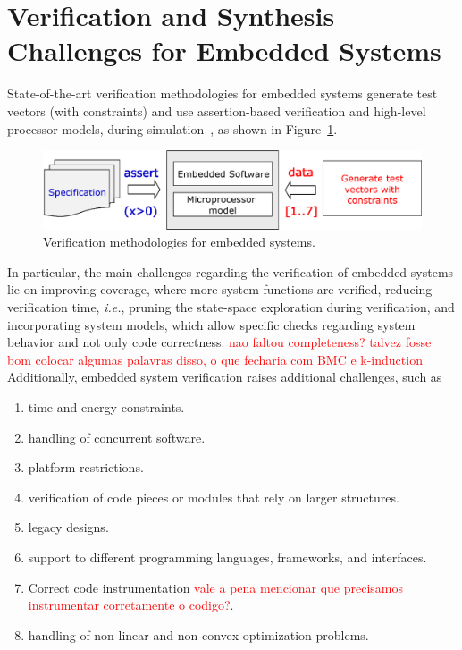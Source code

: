 \documentclass{acm_sen_article}
\begin{document}
\section{Verification and Synthesis \\ Challenges for Embedded Systems}
\label{Verification-Challenges} 

State-of-the-art verification methodologies for embedded systems generate test vectors (with constraints) and use assertion-based verification and high-level processor models, during simulation~\cite{Behrend15,Lettnin09}, as shown in Figure~\ref{verification-methodologies}. 
%
\begin{figure}[h]
	\centering
	\includegraphics[scale=0.35]{figure3.eps}
	\caption{Verification methodologies for embedded systems.}
	\label{verification-methodologies}
\end{figure}


In particular, the main challenges regarding the verification of embedded systems lie on improving coverage, where more system functions are verified, reducing verification time, {\it i.e.}, pruning the state-space exploration during verification, and incorporating system models, which allow specific checks regarding system behavior and not only code correctness. \textcolor{red}{nao faltou completeness? talvez fosse bom colocar algumas palavras disso, o que fecharia com BMC e k-induction} Additionally, embedded system verification raises additional challenges, such as 
%
\begin{enumerate}
	\item time and energy constraints.
	\item handling of concurrent software.
	\item platform restrictions.
	\item verification of code pieces or modules that rely on larger structures.
	\item legacy designs. %
	\item support to different programming languages, frameworks, and interfaces.
	\item Correct code instrumentation \textcolor{red}{vale a pena mencionar que precisamos instrumentar corretamente o codigo?}.
	\item handling of non-linear and non-convex optimization problems.
\end{enumerate}
\end{document}
